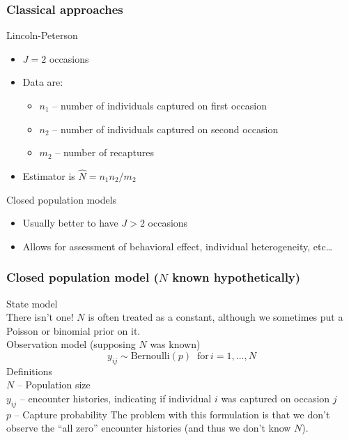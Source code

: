 \documentclass[color=usenames,dvipsnames]{beamer}\usepackage[]{graphicx}\usepackage[]{color}
\begin{document}
\begin{frame}
  \frametitle{Classical approaches}
  Lincoln-Peterson  \\
  \begin{itemize}
    \item $J=2$ occasions
    \item Data are:
      \begin{itemize}
        \item $n_1$ -- number of individuals captured on first occasion
        \item $n_2$ -- number of individuals captured on second occasion
        \item $m_2$ -- number of recaptures
      \end{itemize}
    \item Estimator is $\hat{N} = n_1n_2/m_2$  
  \end{itemize}
  \pause
  \vfill
  Closed population models \\
  \begin{itemize}
    \item Usually better to have $J>2$ occasions
    \item Allows for assessment of behavioral effect, individual heterogeneity, etc\dots
  \end{itemize}
\end{frame}






\begin{frame}
  \frametitle{\large Closed population model ($N$ known hypothetically) }
  \small
  State model \\
  \vspace{6pt}
  {\centering
    There isn't one! $N$ is often treated as a constant, although we
    sometimes put a Poisson or binomial prior on it.  \\
  }
  \pause
  \vfill
  Observation model (supposing $N$ was known)
  \begin{equation*}
    y_{ij} \sim \mathrm{Bernoulli}(p) \;\; \mathrm{for}\, i=1,\dots,N 
  \end{equation*}
  \pause
  \small
  Definitions \\
  $N$ -- Population size \\
  \hangindent=0.8cm $y_{ij}$ -- encounter histories, indicating if
  individual $i$ was captured on occasion $j$ \\  
  $p$ -- Capture probability
  \pause
  \vfill
  The problem with this formulation is that we don't observe the ``all
  zero'' encounter histories (and thus we don't know $N$). 
\end{frame}
\end{document}
